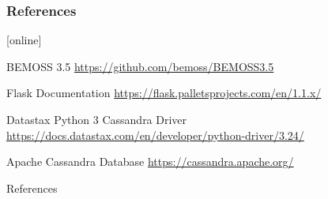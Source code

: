 \documentclass{beamer}
\begin{document}
\begin{frame}[allowframebreaks]
  \frametitle<presentation>{References}
    
  \begin{thebibliography}{10}
    
  [online]
  
  BEMOSS 3.5
  \newblock \url{https://github.com/bemoss/BEMOSS3.5}
  
  Flask Documentation
  \newblock \url{https://flask.palletsprojects.com/en/1.1.x/}
  
  Datastax Python 3 Cassandra Driver
  \newblock \url{https://docs.datastax.com/en/developer/python-driver/3.24/}
  
  Apache Cassandra Database
  \newblock \url{https://cassandra.apache.org/}
  \end{thebibliography}
\end{frame}

\begin{frame}{References}
    
    
\end{frame}
\end{document}
